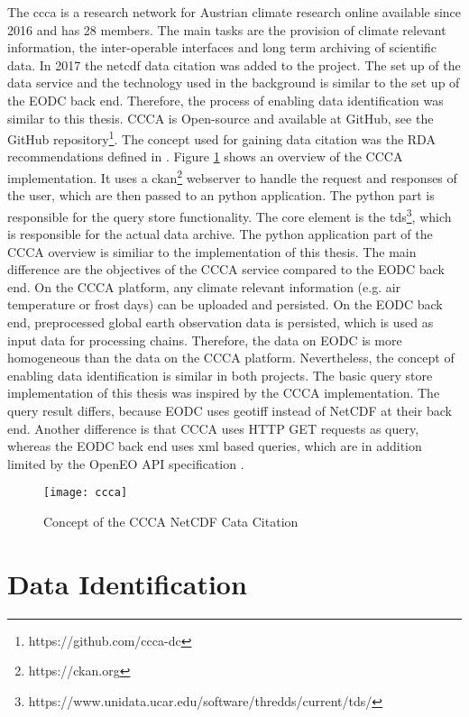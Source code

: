 \documentclass[draft,final]{vutinfth} %
\begin{document}
The \gls{ccca} is a research network for Austrian climate research online available since 2016 and has 28 members. The main tasks are the provision of climate relevant information, the inter-operable interfaces and long term archiving of scientific data. In 2017 the \gls{netcdf} data citation was added to the project. The set up of the data service and the technology used in the background is similar to the set up of the EODC back end. Therefore, the process of enabling data identification was similar to this thesis. CCCA is Open-source and available at GitHub, see the GitHub repository\footnote{https://github.com/ccca-dc}. The concept used for gaining data citation was the RDA recommendations defined in \cite{rauber2016identification}. Figure \ref{fig:ccca} shows an overview of the CCCA implementation. It uses a ckan\footnote{https://ckan.org} webserver to handle the request and responses of the user, which are then passed to an python application. The python part is responsible for the query store functionality. The core element is the \gls{tds}\footnote{https://www.unidata.ucar.edu/software/thredds/current/tds/}, which is responsible for the actual data archive.   
The python application part of the CCCA overview is similiar to the implementation of this thesis. The main difference are the objectives of the CCCA service compared to the EODC back end. On the CCCA platform, any climate relevant information (e.g. air temperature or frost days) can be uploaded and persisted. On the EODC back end, preprocessed global earth observation data is persisted, which is used as input data for processing chains. Therefore, the data on EODC is more homogeneous than the data on the CCCA platform. Nevertheless, the concept of enabling data identification is similar in both projects. The basic query store implementation of this thesis was inspired by the CCCA implementation. The query result differs, because EODC uses \gls{geotiff} instead of NetCDF at their back end. Another difference is that CCCA uses HTTP GET requests as query, whereas the EODC back end uses \gls{xml} based queries, which are in addition limited by the OpenEO API specification  \cite{ccca}.  

\begin{figure}[h]
	\centering
	\texttt{[image: ccca]}
	\caption{Concept of the CCCA NetCDF Cata Citation}
	\label{fig:ccca} %
\end{figure}

\section{Data Identification}\label{Data Identification}
\end{document}
